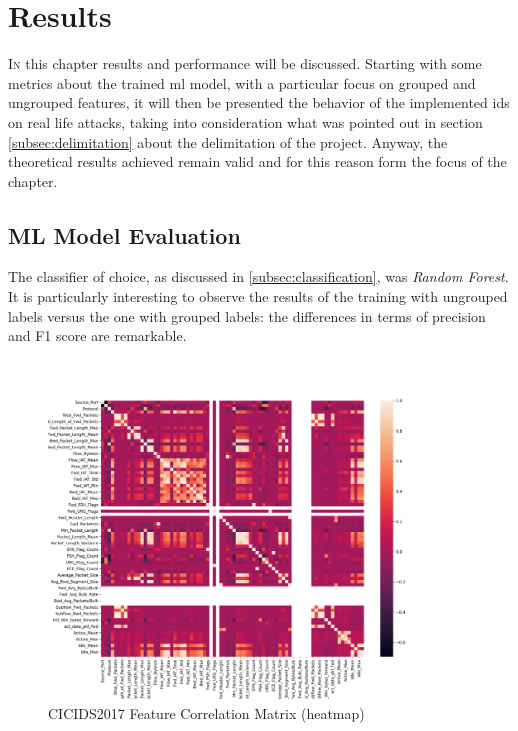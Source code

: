 \chapter{Results}
\label{chap:results}

\lettrine[lines=4, findent=3pt, nindent=0pt]{I}{n} this chapter results and performance will be discussed. Starting with some metrics about the trained \gls{ml} model, with a particular focus on grouped and ungrouped features, it will then be presented the behavior of the implemented \gls{ids} on real life attacks, taking into consideration what was pointed out in section \ref{subsec:delimitation} about the delimitation of the project. Anyway, the theoretical results achieved remain valid and for this reason form the focus of the chapter.

\section{ML Model Evaluation}
\label{sec:ml-model-evaluation}

The classifier of choice, as discussed in \ref{subsec:classification}, was \textit{Random Forest}. It is particularly interesting to observe the results of the training with ungrouped labels versus the one with grouped labels: the differences in terms of precision and F1 score are remarkable.

\begin{figure}[h!]
   \centering
   \includegraphics[scale=0.5]{assets/figures/chapter3/heatmap-all.png}
   \caption{CICIDS2017 Feature Correlation Matrix (heatmap)}
   \label{fig:feature-heatmap}
\end{figure}

